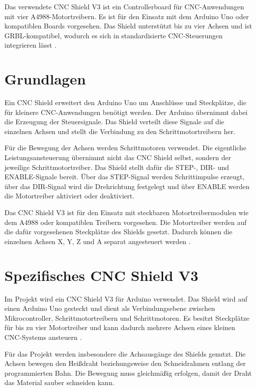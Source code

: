 Das verwendete CNC Shield V3 ist ein Controllerboard für CNC-Anwendungen mit vier A4988-Motortreibern. Es ist für den Einsatz mit dem Arduino Uno oder kompatiblen Boards vorgesehen. Das Shield unterstützt bis zu vier Achsen und ist GRBL-kompatibel, wodurch es sich in standardisierte CNC-Steuerungen integrieren lässt \cite{JoyIT:CNCShield:Datenblatt}\cite{JoyIT:CNCShield:Anleitung}.

\section{Grundlagen}

Ein CNC Shield erweitert den Arduino Uno um Anschlüsse und Steckplätze, die für kleinere CNC-Anwendungen benötigt werden. Der Arduino übernimmt dabei die Erzeugung der Steuersignale. Das Shield verteilt diese Signale auf die einzelnen Achsen und stellt die Verbindung zu den Schrittmotortreibern her.

Für die Bewegung der Achsen werden Schrittmotoren verwendet. Die eigentliche Leistungsansteuerung übernimmt nicht das CNC Shield selbst, sondern der jeweilige Schrittmotortreiber. Das Shield stellt dafür die STEP-, DIR- und ENABLE-Signale bereit. Über das STEP-Signal werden Schrittimpulse erzeugt, über das DIR-Signal wird die Drehrichtung festgelegt und über ENABLE werden die Motortreiber aktiviert oder deaktiviert.

Das CNC Shield V3 ist für den Einsatz mit steckbaren Motortreibermodulen wie dem A4988 oder kompatiblen Treibern vorgesehen. Die Motortreiber werden auf die dafür vorgesehenen Steckplätze des Shields gesetzt. Dadurch können die einzelnen Achsen X, Y, Z und A separat angesteuert werden \cite{JoyIT:CNCShield:Anleitung}.

\section{Spezifisches CNC Shield V3}

Im Projekt wird ein CNC Shield V3 für Arduino verwendet. Das Shield wird auf einen Arduino Uno gesteckt und dient als Verbindungsebene zwischen Mikrocontroller, Schrittmotortreibern und Schrittmotoren. Es besitzt Steckplätze für bis zu vier Motortreiber und kann dadurch mehrere Achsen eines kleinen CNC-Systems ansteuern \cite{JoyIT:CNCShield:Datenblatt}.

Für das Projekt werden insbesondere die Achsausgänge des Shields genutzt. Die Achsen bewegen den Heißdraht beziehungsweise den Schneidrahmen entlang der programmierten Bahn. Die Bewegung muss gleichmäßig erfolgen, damit der Draht das Material sauber schneiden kann.

